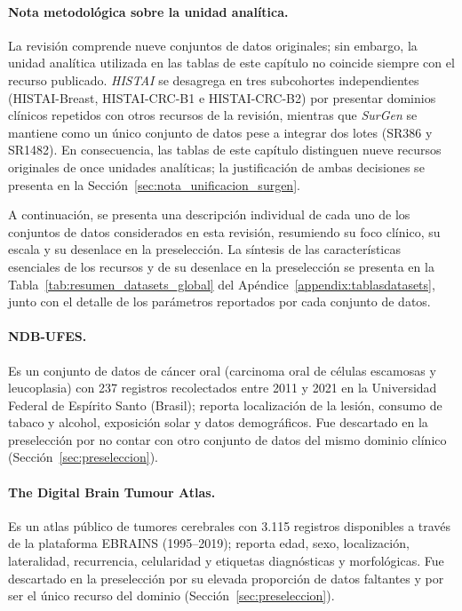 \paragraph{Nota metodológica sobre la unidad analítica.} La revisión comprende nueve conjuntos de datos originales; sin embargo, la unidad analítica utilizada en las tablas de este capítulo no coincide siempre con el recurso publicado. \textit{HISTAI} se desagrega en tres subcohortes independientes (HISTAI-Breast, HISTAI-CRC-B1 e HISTAI-CRC-B2) por presentar dominios clínicos repetidos con otros recursos de la revisión, mientras que \textit{SurGen} se mantiene como un único conjunto de datos pese a integrar dos lotes (SR386 y SR1482). En consecuencia, las tablas de este capítulo distinguen nueve recursos originales de once unidades analíticas; la justificación de ambas decisiones se presenta en la Sección~\ref{sec:nota_unificacion_surgen}.

A continuación, se presenta una descripción individual de cada uno de los conjuntos de datos considerados en esta revisión, resumiendo su foco clínico, su escala y su desenlace en la preselección. La síntesis de las características esenciales de los recursos y de su desenlace en la preselección se presenta en la Tabla~\ref{tab:resumen_datasets_global} del Apéndice~\ref{appendix:tablasdatasets}, junto con el detalle de los parámetros reportados por cada conjunto de datos.

\paragraph{NDB-UFES.} Es un conjunto de datos de cáncer oral (carcinoma oral de células escamosas y leucoplasia) con 237 registros recolectados entre 2011 y 2021 en la Universidad Federal de Espírito Santo (Brasil); reporta localización de la lesión, consumo de tabaco y alcohol, exposición solar y datos demográficos. Fue descartado en la preselección por no contar con otro conjunto de datos del mismo dominio clínico \parencite{NDBUFES2023} (Sección~\ref{sec:preseleccion}).

\paragraph{The Digital Brain Tumour Atlas.} Es un atlas público de tumores cerebrales con 3.115 registros disponibles a través de la plataforma EBRAINS (1995--2019); reporta edad, sexo, localización, lateralidad, recurrencia, celularidad y etiquetas diagnósticas y morfológicas. Fue descartado en la preselección por su elevada proporción de datos faltantes y por ser el único recurso del dominio \parencite{DigitalBrainTumourAtlas2022} (Sección~\ref{sec:preseleccion}).

